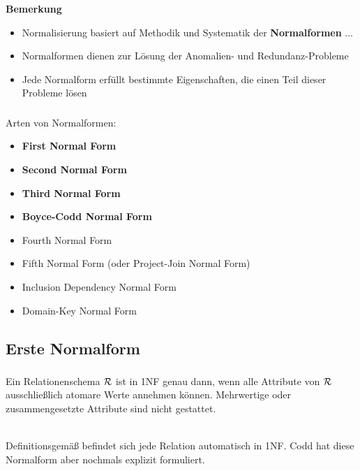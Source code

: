 \begin{frame}[t]
\frametitle{\insertsection}
\framesubtitle{\insertsubsection}
\begin{block}{\textbf{Bemerkung}}
	\begin{itemize}
		\item Normalisierung basiert auf Methodik und Systematik der \textbf{Normalformen} ...\\[12pt]
		\item Normalformen dienen zur L\"osung der Anomalien- und Redundanz-Probleme
		\item Jede Normalform erf\"ullt bestimmte Eigenschaften, die einen Teil dieser Probleme l\"osen
	\end{itemize}
\end{block}
\end{frame}

\begin{frame}[t]
\frametitle{\insertsection}
\framesubtitle{\insertsubsection}
Arten von Normalformen:
\begin{itemize}
	\item \textbf{First Normal Form}\\[4pt]
	\item \textbf{Second Normal Form}\\[4pt]
	\item \textbf{Third Normal Form}\\[4pt]
	\item \textbf{Boyce-Codd Normal Form}\\[4pt]
	\item Fourth Normal Form\\[4pt]
	\item Fifth Normal Form (oder Project-Join Normal Form)\\[4pt]
	\item Inclusion Dependency Normal Form\\[4pt]
	\item Domain-Key Normal Form
\end{itemize}
\end{frame}

\subsection{Erste Normalform}

\begin{frame}[t]
\frametitle{\insertsection}
\framesubtitle{\insertsubsection}
\onslide
\begin{definition}\label{def:1nf}
	Ein Relationenschema $\mathcal{R}$ ist in 1NF genau dann, wenn alle Attribute von $\mathcal{R}$ ausschließlich atomare Werte 
	annehmen k\"onnen. Mehrwertige oder zusammengesetzte Attribute sind nicht gestattet.
\end{definition}
\pause
\nl\\[18pt]
{Definitionsgem\"a\ss} befindet sich jede Relation automatisch in 1NF.
\nl
Codd hat diese Normalform aber nochmals explizit formuliert.
\end{frame}

